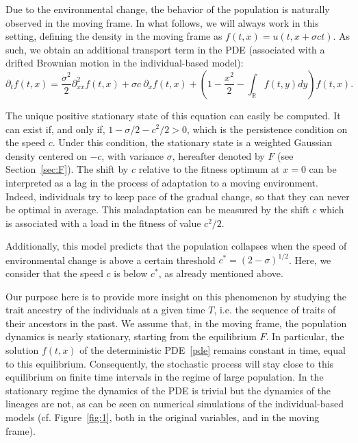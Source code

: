 \documentclass[AHL,Unicode,longabstracts,published]{cedram}
\newcommand*\R{\mathbb{R}}
\begin{document}
Due to the environmental change, the behavior of the population is naturally observed in the moving frame. In what follows, we will always work in this setting, defining the density in the moving frame as $f(t,x)=u(t,x+\sigma c t)$. As such, we obtain an additional transport term in the PDE (associated with a drifted Brownian motion in the individual-based model):
\begin{equation}\label{pde}
\partial_{t}f(t,x)=\frac{\sigma^2}{2}\partial^2_{xx} f(t,x)+ \sigma c \ \partial_{x}f(t,x) + \left(1-\frac{x^2}{2}-\int_{\R}f(t,y)dy \right)f(t,x).
\end{equation}


The unique positive stationary state of this equation can easily be computed. It can exist if, and only if, $1-\sigma/2-c^2/2>0$, which is the persistence condition on the speed $c$. Under this condition, the stationary state is a weighted Gaussian density centered on $-c$, with variance $\sigma$, hereafter denoted by $F$ (see Section~\ref{sec:F}). The shift by $c$ relative to the fitness optimum at $x=0$ can be interpreted as a lag in the process of adaptation to a moving environment. Indeed, individuals try to keep pace of the gradual change, so that they can never be optimal in average. This maladaptation can be measured by the shift $c$ which is associated with a load in the fitness of value $c^2/2$.

Additionally, this model predicts that the population collapses when the speed of environmental change is above a certain threshold $c^* = (2 - \sigma)^{1/2}$. Here, we consider that the speed $c$ is below $c^*$, as already mentioned above.

Our purpose here is to provide more insight on this phenomenon by studying the trait ancestry of the individuals at a given time $T$, i.e. the sequence of traits of their ancestors in the past. We assume that, in the moving frame, the population dynamics is nearly stationary, starting from the equilibrium $F$. In particular, the solution $f(t,x)$ of the deterministic PDE~\eqref{pde} remains constant in time, equal to this equilibrium. Consequently, the stochastic process will stay close to this equilibrium on finite time intervals in the regime of large population. In the stationary regime the dynamics of the PDE is trivial but the dynamics of the lineages are not, as can be seen on numerical simulations of the individual-based models (cf. Figure~\ref{fig:1}, both in the original variables, and in the moving frame).
\end{document}
